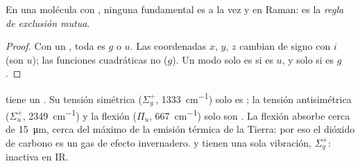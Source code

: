 \begin{proposition}\label{prop:b3:group-theory-applied:mutual-exclusion}
En una molécula con , ninguna fundamental es a la vez  y en
Raman: es la \emph{regla de exclusión mutua}.
\end{proposition}

\begin{proof}
Con un , toda  es $g$ o $u$. Las
coordenadas $x$, $y$, $z$ cambian de signo con $i$ (son $u$); las funciones
cuadráticas no ($g$). Un modo solo es  si es $u$, y solo  si es
$g$.
\end{proof}

\begin{example}\label{ex:b3:group-theory-applied:co2}
 tiene un . Su tensión simétrica ($\Sigma_g^+$,
\qty{1333}{cm^{-1}}) solo es ; la tensión antisimétrica ($\Sigma_u^+$,
\qty{2349}{cm^{-1}}) y la flexión ($\Pi_u$, \qty{667}{cm^{-1}}) solo son .
La flexión absorbe cerca de \qty{15}{\micro m}, cerca del máximo de la emisión
térmica de la Tierra: por eso el dióxido de carbono es un gas de efecto invernadero.  y
 tienen una sola vibración, $\Sigma_g^+$: inactiva en IR.
\end{example}

